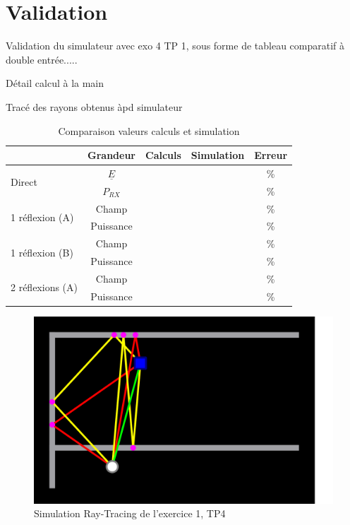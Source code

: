 \chapter{Validation}
\label{chaper-3}

Validation du simulateur avec exo 4 TP 1, sous forme de tableau comparatif à double entrée.....

Détail calcul à la main

Tracé des rayons obtenus àpd simulateur



\begin{table}
    \centering
    \begin{tabular}{|l|c|c|c|c|}
         \hline
                                  & Grandeur & Calculs & Simulation & Erreur \\
        \hline
\multirow{2}{*}{Direct}           & $\underline{E}$ &         &      & \%     \\
                                  & $P_{RX}$        &         &      & \%     \\
        \hline
\multirow{2}{*}{1 réflexion (A)}  & Champ     &         &      & \%     \\
                                  & Puissance &         &      & \%     \\
        \hline
\multirow{2}{*}{1 réflexion (B)}  & Champ     &         &      & \%     \\
                                  & Puissance &         &      & \%     \\
        \hline
\multirow{2}{*}{2 réflexions (A)} & Champ     &         &      & \%     \\
                                  & Puissance &         &      & \%     \\
        \hline
    \end{tabular}
    \caption{Comparaison valeurs calculs et simulation}
    \label{tab:comparaison-calculs-simulation}
\end{table}


\begin{figure}[H]
    \centering
    \includegraphics[width=\textwidth]{latex/images/tp4.png}
    \caption{Simulation Ray-Tracing de l'exercice 1, TP4}
    \label{fig:simu-tp4}
\end{figure}

